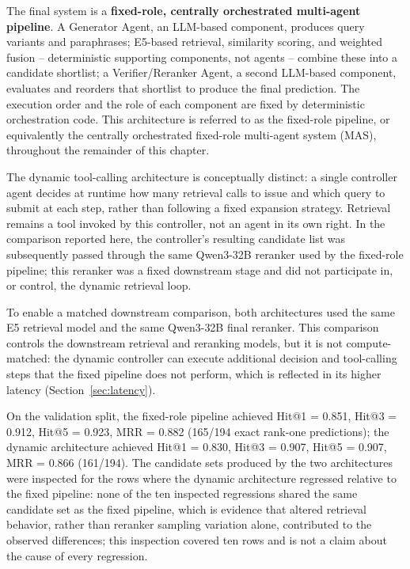 The final system is a \textbf{fixed-role, centrally orchestrated multi-agent pipeline}. A Generator Agent, an LLM-based component, produces query variants and paraphrases; E5-based retrieval, similarity scoring, and weighted fusion -- deterministic supporting components, not agents -- combine these into a candidate shortlist; a Verifier/Reranker Agent, a second LLM-based component, evaluates and reorders that shortlist to produce the final prediction. The execution order and the role of each component are fixed by deterministic orchestration code. This architecture is referred to as the fixed-role pipeline, or equivalently the centrally orchestrated fixed-role multi-agent system (MAS), throughout the remainder of this chapter.

The dynamic tool-calling architecture is conceptually distinct: a single controller agent decides at runtime how many retrieval calls to issue and which query to submit at each step, rather than following a fixed expansion strategy. Retrieval remains a tool invoked by this controller, not an agent in its own right. In the comparison reported here, the controller's resulting candidate list was subsequently passed through the same Qwen3-32B reranker used by the fixed-role pipeline; this reranker was a fixed downstream stage and did not participate in, or control, the dynamic retrieval loop.

To enable a matched downstream comparison, both architectures used the same E5 retrieval model and the same Qwen3-32B final reranker. This comparison controls the downstream retrieval and reranking models, but it is not compute-matched: the dynamic controller can execute additional decision and tool-calling steps that the fixed pipeline does not perform, which is reflected in its higher latency (Section~\ref{sec:latency}).

On the validation split, the fixed-role pipeline achieved Hit@1 = 0.851, Hit@3 = 0.912, Hit@5 = 0.923, MRR = 0.882 (165/194 exact rank-one predictions); the dynamic architecture achieved Hit@1 = 0.830, Hit@3 = 0.907, Hit@5 = 0.907, MRR = 0.866 (161/194). The candidate sets produced by the two architectures were inspected for the rows where the dynamic architecture regressed relative to the fixed pipeline: none of the ten inspected regressions shared the same candidate set as the fixed pipeline, which is evidence that altered retrieval behavior, rather than reranker sampling variation alone, contributed to the observed differences; this inspection covered ten rows and is not a claim about the cause of every regression.

